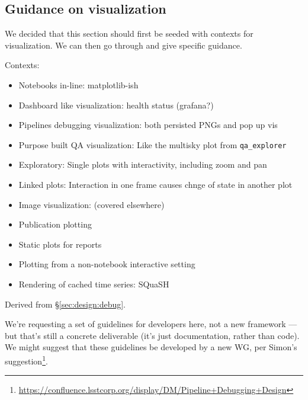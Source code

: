 \subsection{Guidance on visualization}
\label{sec:comp:vis}

We decided that this section should first be seeded with contexts for visualization. We can then go through and give specific guidance.

Contexts:
\begin{itemize}
\item Notebooks in-line: matplotlib-ish
\item Dashboard like visualization: health status (grafana?)
\item Pipelines debugging visualization: both persisted PNGs and pop up vis
\item Purpose built QA visualization: Like the multisky plot from \texttt{qa\_explorer}
\item Exploratory: Single plots with interactivity, including zoom and pan
\item Linked plots: Interaction in one frame causes chnge of state in another plot
\item Image visualization: (covered elsewhere)
\item Publication plotting
\item Static plots for reports
\item Plotting from a non-notebook interactive setting
\item Rendering of cached time series: SQuaSH
\end{itemize}

Derived from \S\ref{sec:design:debug}.

We're requesting a set of guidelines for developers here, not a new framework
--- but that's still a concrete deliverable (it's just documentation, rather
than code). We might suggest that these guidelines be developed by a new WG,
per Simon's
suggestion\footnote{\url{https://confluence.lsstcorp.org/display/DM/Pipeline+Debugging+Design}}.
